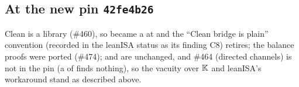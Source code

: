 \subsection{At the new pin \texorpdfstring{\texttt{42fe4b26}}{42fe4b26}}\label{sec:gen-lib-clean-new}

Clean is a  library (\#460), so \allowbreak{}\allowbreak{} became a
 at  and the \enquote{Clean bridge is plain} convention (recorded in the leanISA
status as its finding C8) retires; the balance proofs were ported (\#474);  and
 are unchanged, and \#464 (directed channels) is not in the pin (a
 of  finds nothing), so the vacuity over $\mathbb{K}$ and
leanISA's workaround stand as described above.

\par\endgroup